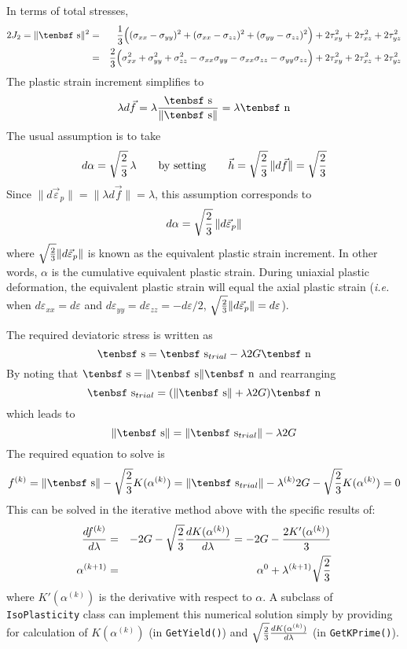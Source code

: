 \documentclass[11pt]{article}
\def\dev{\hbox{\tenbsf s}}
\def\ndev{\hbox{\tenbsf n}}
\def\code#1{{\small\tt #1}}
\def\dpl{d \vec{\varepsilon}_{p}}
\def\df{d \vec{f}}
\def\s#1{\sigma_{#1}}
\begin{document}
In terms of total stresses,
\begin{eqnarray}
     2J_2 = \|\dev\|^2 & = & {1\over 3}\Bigl( (\s{xx}-\s{yy})^2 + (\s{xx}-\s{zz})^2  + (\s{yy}-\s{zz})^2 \Bigr) + 2\tau_{xy}^2 + 2\tau_{xz}^2 + 2\tau_{yz}^2 \\
         & = & {2\over3}\Bigl( \s{xx}^2 + \s{yy}^2 + \s{zz}^2 - \s{xx}\s{yy} - \s{xx}\s{zz} - \s{yy}\s{zz}\Bigr) + 2\tau_{xy}^2 + 2\tau_{xz}^2 + 2\tau_{yz}^2
\end{eqnarray}
The plastic strain increment simplifies to
\begin{equation}
     \lambda \df = \lambda {\dev\over \|\dev\|} = \lambda \ndev
\end{equation}
The usual assumption is to take
\begin{equation}
        d\alpha = \sqrt{2\over3}\thinspace \lambda \qquad{\rm by\ setting} \qquad \vec h = \sqrt{2\over3}\thinspace \|\df\| =  \sqrt{2\over3}
\end{equation}
Since $\|\dpl\| = \|\lambda \df\| = \lambda$, this assumption corresponds to
\begin{equation}
     d\alpha = \sqrt{2\over3}\thinspace \|\dpl\|
\end{equation}
where $\sqrt{2\over3}\|\dpl\|$ is known as the equivalent plastic strain increment. In other words, $\alpha$ is the cumulative equivalent plastic strain. During uniaxial plastic deformation, the equivalent plastic strain will equal the axial plastic strain ({\em i.e.} when $d\varepsilon_{xx}=d\varepsilon$ and $d\varepsilon_{yy}=d\varepsilon_{zz} = -d\varepsilon/2$, $\sqrt{2\over3}\|\dpl\| = d\varepsilon$).

The required deviatoric stress is written as
\begin{equation}
        \dev = \dev_{trial} - \lambda 2G\ndev
\end{equation}
By noting that $\dev=\|\dev\|\ndev$ and rearranging
\begin{equation}
      \dev_{trial} = (\|\dev\| + \lambda 2G)\ndev
\end{equation}
which leads to
\begin{equation}
         \|\dev\| =  \|\dev_{trial}\| - \lambda 2G
\end{equation}
The required equation to solve is
\begin{equation}
      f^{(k)} = \|\dev\| -  \sqrt{2\over3} K(\alpha^{(k)}) = \|\dev_{trial}\| - \lambda^{(k)} 2G -  \sqrt{2\over3} K(\alpha^{(k)}) = 0
\end{equation}
This can be solved in the iterative method above with the specific results of:
\begin{eqnarray}
        {df^{(k)}\over d\lambda} & = & -2G - \sqrt{2\over3}{dK(\alpha^{(k)})\over d\lambda}  = -2G - {2K'(\alpha^{(k)})\over 3} \\
        \alpha^{(k+1)} & = & \alpha^{0} +  \lambda^{(k+1)} \sqrt{2\over3}
\end{eqnarray}
where $K'(\alpha^{(k)})$ is the derivative with respect to $\alpha$. A subclass of \code{IsoPlasticity} class can implement this numerical solution simply by providing for calculation of $K(\alpha^{(k)})$ (in \code{GetYield()}) and $\sqrt{2\over3}{dK(\alpha^{(k)})\over d\lambda}$ (in \code{GetKPrime()}).
\end{document}
